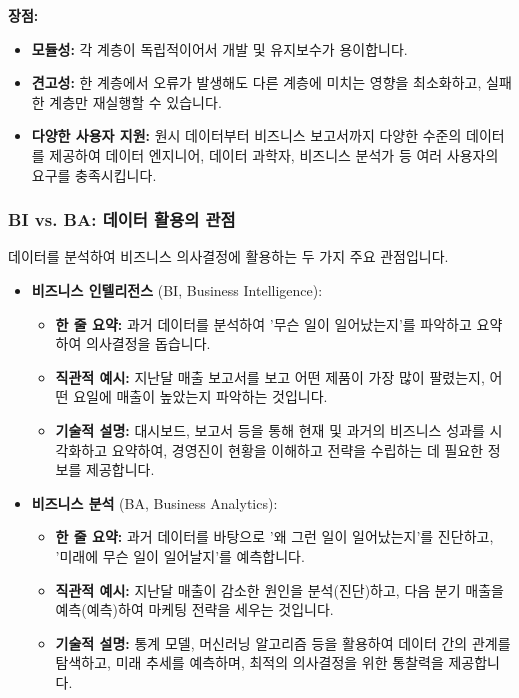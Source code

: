 \documentclass[11pt,a4paper]{article}
\theoremstyle{definition}
\begin{document}
\begin{itemize}
\begin{itemize}
        \textbf{장점:}
        \begin{itemize}
            \item \textbf{모듈성:} 각 계층이 독립적이어서 개발 및 유지보수가 용이합니다.
            \item \textbf{견고성:} 한 계층에서 오류가 발생해도 다른 계층에 미치는 영향을 최소화하고, 실패한 계층만 재실행할 수 있습니다.
            \item \textbf{다양한 사용자 지원:} 원시 데이터부터 비즈니스 보고서까지 다양한 수준의 데이터를 제공하여 데이터 엔지니어, 데이터 과학자, 비즈니스 분석가 등 여러 사용자의 요구를 충족시킵니다.
        \end{itemize}
    \end{itemize}
\end{itemize}

\subsubsection*{BI vs. BA: 데이터 활용의 관점}
데이터를 분석하여 비즈니스 의사결정에 활용하는 두 가지 주요 관점입니다.
\begin{itemize}
    \item \textbf{비즈니스 인텔리전스} (BI, Business Intelligence):
    \begin{itemize}
        \item \textbf{한 줄 요약:} 과거 데이터를 분석하여 '무슨 일이 일어났는지'를 파악하고 요약하여 의사결정을 돕습니다.
        \item \textbf{직관적 예시:} 지난달 매출 보고서를 보고 어떤 제품이 가장 많이 팔렸는지, 어떤 요일에 매출이 높았는지 파악하는 것입니다.
        \item \textbf{기술적 설명:} 대시보드, 보고서 등을 통해 현재 및 과거의 비즈니스 성과를 시각화하고 요약하여, 경영진이 현황을 이해하고 전략을 수립하는 데 필요한 정보를 제공합니다.
    \end{itemize}
    \item \textbf{비즈니스 분석} (BA, Business Analytics):
    \begin{itemize}
        \item \textbf{한 줄 요약:} 과거 데이터를 바탕으로 '왜 그런 일이 일어났는지'를 진단하고, '미래에 무슨 일이 일어날지'를 예측합니다.
        \item \textbf{직관적 예시:} 지난달 매출이 감소한 원인을 분석(진단)하고, 다음 분기 매출을 예측(예측)하여 마케팅 전략을 세우는 것입니다.
        \item \textbf{기술적 설명:} 통계 모델, 머신러닝 알고리즘 등을 활용하여 데이터 간의 관계를 탐색하고, 미래 추세를 예측하며, 최적의 의사결정을 위한 통찰력을 제공합니다.
    \end{itemize}
\end{itemize}
\end{document}
